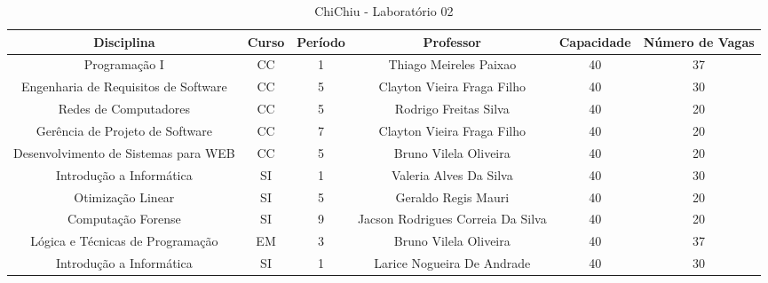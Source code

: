 \begin{apendices}
\begin{table}[!h]
\begin{adjustbox}{width=1\textwidth,center=\textwidth}
\centering
\begin{tabular}{|c|c|c|c|c|c|}
\hline
\textbf{Disciplina} & \textbf{Curso} & \textbf{Período} & \textbf{Professor} & \textbf{Capacidade} & \textbf{Número de Vagas} \\ \hline
Programação I & CC & 1 & Thiago Meireles Paixao & 40 & 37 \\ \hline
Engenharia de Requisitos de Software & CC & 5 & Clayton Vieira Fraga Filho & 40 & 30 \\ \hline
Redes de Computadores & CC & 5 & Rodrigo Freitas Silva & 40 & 20 \\ \hline
Gerência de Projeto de Software & CC & 7 & Clayton Vieira Fraga Filho & 40 & 20 \\ \hline
Desenvolvimento de Sistemas para WEB & CC & 5 & Bruno Vilela Oliveira & 40 & 20 \\ \hline
Introdução a Informática & SI & 1 & Valeria Alves Da Silva & 40 & 30 \\ \hline
Otimização Linear & SI & 5 & Geraldo Regis Mauri & 40 & 20 \\ \hline
Computação Forense & SI & 9 & Jacson Rodrigues Correia Da Silva & 40 & 20 \\ \hline
Lógica e Técnicas de Programação & EM & 3 & Bruno Vilela Oliveira & 40 & 37 \\ \hline
Introdução a Informática & SI & 1 & Larice Nogueira De Andrade & 40 & 30 \\ \hline
\end{tabular}
\end{adjustbox}
\caption{ChiChiu - Laboratório 02}
\end{table}


\end{apendices}
